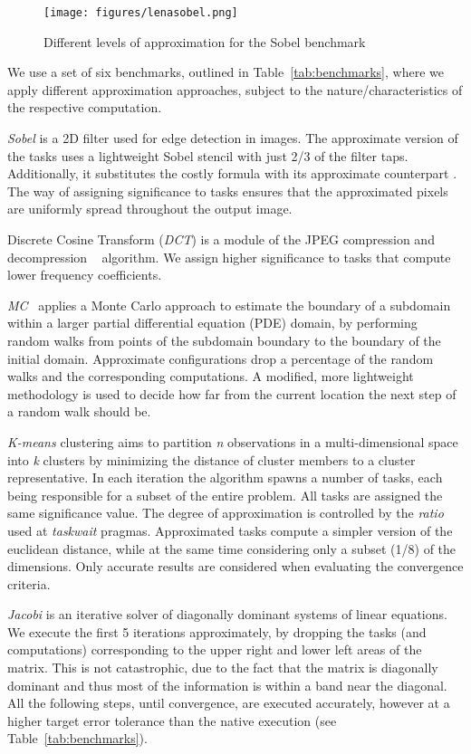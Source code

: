 \begin{figure}[tb]
\centering
\texttt{[image: figures/lenasobel.png]}
\caption{ Different levels of approximation for the Sobel benchmark}\label{fig:lena_sobel}
\end{figure}

We use a set of six benchmarks, outlined in Table~\ref{tab:benchmarks}, where we apply different approximation approaches, subject to the nature/characteristics of the respective computation. 

\textit{Sobel} is a 2D filter used for edge detection in images. The approximate version of the tasks uses a lightweight Sobel stencil with just 2/3 of the filter taps. Additionally, it substitutes the costly formula  with its approximate counterpart . The way of assigning significance to tasks ensures that the approximated pixels are uniformly spread throughout the output image.

Discrete Cosine Transform (\textit{DCT}) is a module of the JPEG compression and decompression ~\cite{skodras2001jpeg} algorithm. We assign higher significance to tasks that compute lower frequency coefficients. 

\textit{MC}~\cite{Vavalis_hpde} applies a Monte Carlo approach to estimate the boundary of a subdomain within a larger partial differential equation (PDE) domain, by performing random walks from points of the subdomain boundary to the boundary of the initial domain. Approximate configurations drop a percentage of the random walks and the corresponding computations. A modified, more lightweight methodology is used to decide how far from the current location the next step of a random walk should be.

\textit{K-means} clustering aims to partition \textit{n} observations in a multi-dimensional space into \textit{k} clusters by minimizing the distance of cluster members to a cluster representative. In each iteration the algorithm spawns a number of tasks, each being responsible for a subset of the entire problem. All tasks are assigned the same significance value. The degree of approximation is controlled by the {\it ratio} used at {\it taskwait} pragmas. Approximated tasks compute a simpler version of the euclidean distance, while at the same time considering only a subset (1/8) of the dimensions. Only accurate results are considered when evaluating the convergence criteria. 

\textit{Jacobi} is an iterative solver of diagonally dominant systems of linear equations. We execute the first 5 iterations approximately, by dropping the tasks (and computations) corresponding to the upper right and lower left areas of the matrix. This is not catastrophic, due to the fact that the matrix is diagonally dominant and thus most of the information is within a band near the diagonal. All the following steps, until convergence, are executed accurately, however at a higher target error tolerance than the native execution (see Table~\ref{tab:benchmarks}).


